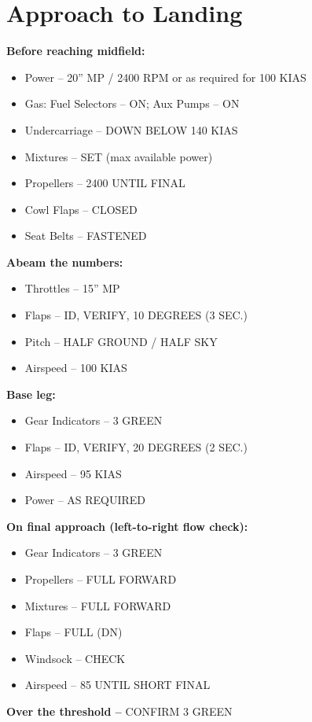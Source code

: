 \section{Approach to Landing}
\textbf{Before reaching midfield:}
\begin{itemize}[label={}]
\item Power – 20” MP / 2400 RPM or as required for 100 KIAS
\item Gas: Fuel Selectors – ON; Aux Pumps – ON
\item Undercarriage – DOWN BELOW 140 KIAS
\item Mixtures – SET (max available power)
\item Propellers – 2400 UNTIL FINAL
\item Cowl Flaps – CLOSED
\item Seat Belts – FASTENED
\end{itemize}

\textbf{Abeam the numbers:}
\begin{itemize}[label={}]
\item Throttles – 15” MP
\item Flaps – ID, VERIFY, 10 DEGREES (3 SEC.)
\item Pitch – HALF GROUND / HALF SKY
\item Airspeed – 100 KIAS
\end{itemize}

\textbf{Base leg:}
\begin{itemize}[label={}]
\item Gear Indicators – 3 GREEN
\item Flaps – ID, VERIFY, 20 DEGREES (2 SEC.)
\item Airspeed – 95 KIAS
\item Power – AS REQUIRED
\end{itemize}

\textbf{On final approach (left-to-right flow check):}
\begin{itemize}[label={}]
\item Gear Indicators – 3 GREEN
\item Propellers – FULL FORWARD
\item Mixtures – FULL FORWARD
\item Flaps – FULL (DN)
\item Windsock – CHECK
\item Airspeed – 85 UNTIL SHORT FINAL
\end{itemize}

\textbf{Over the threshold –} CONFIRM 3 GREEN

